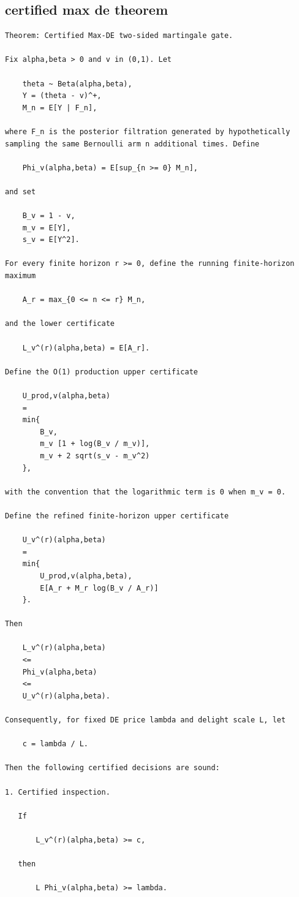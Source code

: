 \subsection{certified max de theorem}
\begin{small}
\begin{verbatim}
Theorem: Certified Max-DE two-sided martingale gate.

Fix alpha,beta > 0 and v in (0,1). Let

    theta ~ Beta(alpha,beta),
    Y = (theta - v)^+,
    M_n = E[Y | F_n],

where F_n is the posterior filtration generated by hypothetically sampling the same Bernoulli arm n additional times. Define

    Phi_v(alpha,beta) = E[sup_{n >= 0} M_n],

and set

    B_v = 1 - v,
    m_v = E[Y],
    s_v = E[Y^2].

For every finite horizon r >= 0, define the running finite-horizon maximum

    A_r = max_{0 <= n <= r} M_n,

and the lower certificate

    L_v^(r)(alpha,beta) = E[A_r].

Define the O(1) production upper certificate

    U_prod,v(alpha,beta)
    =
    min{
        B_v,
        m_v [1 + log(B_v / m_v)],
        m_v + 2 sqrt(s_v - m_v^2)
    },

with the convention that the logarithmic term is 0 when m_v = 0.

Define the refined finite-horizon upper certificate

    U_v^(r)(alpha,beta)
    =
    min{
        U_prod,v(alpha,beta),
        E[A_r + M_r log(B_v / A_r)]
    }.

Then

    L_v^(r)(alpha,beta)
    <=
    Phi_v(alpha,beta)
    <=
    U_v^(r)(alpha,beta).

Consequently, for fixed DE price lambda and delight scale L, let

    c = lambda / L.

Then the following certified decisions are sound:

1. Certified inspection.

   If

       L_v^(r)(alpha,beta) >= c,

   then

       L Phi_v(alpha,beta) >= lambda.


\end{verbatim}
\end{small}
